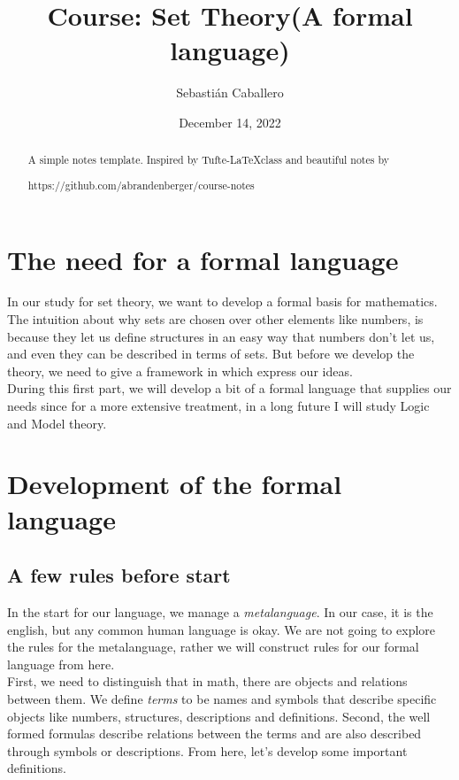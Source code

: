 \documentclass{tufte-handout}
\title{Course:  Set Theory(A formal language)}
\author{Sebastián Caballero}
\date{December 14, 2022}
\begin{document}
\maketitle

\begin{abstract}
\noindent
A simple notes template. Inspired by Tufte-\LaTeX class and beautiful notes by \begin{verbatim*}
	https://github.com/abrandenberger/course-notes
\end{verbatim*}
\end{abstract}

\section{The need for a formal language}
In our study for set theory, we want to develop a formal basis for mathematics. The intuition about why sets are chosen over other elements like numbers, is because they let us define structures in an easy way that numbers don't let us, and even they can be described in terms of sets. But before we develop the theory, we need to give a framework in which express our ideas.\\

During this first part, we will develop a bit of a formal language that supplies our needs since for a more extensive treatment, in a long future I will study Logic and Model theory.

\section{Development of the formal language}
\subsection{A few rules before start}
In the start for our language, we manage a \textit{metalanguage}. In our case, it is the english, but any common human language is okay. We are not going to explore the rules for the metalanguage, rather we will construct rules for our formal language from here.\\

First, we need to distinguish that in math, there are objects and relations between them. We define \textit{terms} to be names and symbols that describe specific objects like numbers, structures, descriptions and definitions. Second, the well formed formulas describe relations between the terms and are also described through symbols or descriptions. From here, let's develop some important definitions.\\
\end{document}
